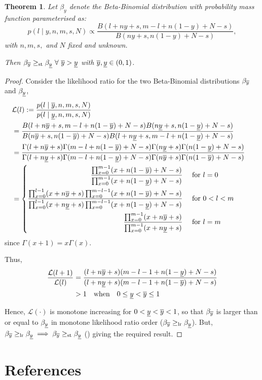 \documentclass[12pt, a4paper]{elsarticle}
\newtheorem{theorem}{Theorem}
\begin{document}
\begin{theorem}
  \label{thm:y}
  Let $\beta_y$ denote the Beta-Binomial distribution with probability mass function parameterised as:
  \[ p(l \mid y, n, m, s, N) \propto \frac{B(l + ny + s, m - l + n(1-y) + N - s)}{B(ny + s, n(1-y) + N - s)}, \]
  with $n, m, s,$ and $N$ fixed and unknown.
  
  Then $\beta_{\overline{y}} \ge_{\mathrm{st}} \beta_{\underline{y}} \ \forall \ \overline{y} > \underline{y}$ with $\overline{y}, \underline{y} \in (0,1)$.
\end{theorem}

\begin{proof}%
  \label{prf:y}
  Consider the likelihood ratio for the two Beta-Binomial distributions $\beta_{\overline{y}}$ and $\beta_{\underline{y}}$,
  \begin{align*}
    \lefteqn{\mathcal{L}(l) := \frac{p(l \mid \yu, n, m, s, N)}{p(l \mid \yl, n, m, s, N)}} \\
    &= \frac{B(l + n \yu + s, m - l + n (1 - \yu) + N - s) B(n \yl + s, n (1 - \yl) + N - s)}
            {B(n \yu + s, n (1 - \yu) + N - s) B(l + n \yl + s, m - l + n (1 - \yl) + N - s)} \\
    &= \frac{\Gamma(l + n \yu + s) \Gamma(m - l + n (1 - \yu) + N - s) \Gamma(n \yl + s) \Gamma(n (1 - \yl) + N - s)}
            {\Gamma(l + n \yl + s) \Gamma(m - l + n (1 - \yl) + N - s) \Gamma(n \yu + s) \Gamma(n (1 - \yu) + N - s)} \\
    &= \left\{ \begin{aligned}
         \frac{\prod_{x=0}^{m-1} (x + n (1 - \yu) + N - s)}
              {\prod_{x=0}^{m-1} (x + n (1 - \yl) + N - s)} &\quad\mbox{ for } l=0 \\
         \frac{\prod_{x=0}^{l-1} (x + n \yu + s) \prod_{x=0}^{m-l-1} (x + n (1 - \yu) + N - s)}
              {\prod_{x=0}^{l-1} (x + n \yl + s) \prod_{x=0}^{m-l-1} (x + n (1 - \yl) + N - s)} &\quad\mbox{ for } 0<l<m \\
         \frac{\prod_{x=0}^{m-1} (x + n \yu + s)}
              {\prod_{x=0}^{m-1} (x + n \yl + s)} &\quad\mbox{ for } l=m
       \end{aligned} \right.
  \end{align*}
  since $\Gamma(x+1)=x \Gamma(x)$.
  
  Thus,
  \begin{align*}
    \frac{\mathcal{L}(l+1)}{\mathcal{L}(l)} &=
      \frac{(l + n \overline{y} + s) (m - l - 1 + n (1 - \underline{y}) + N - s)}
           {(l + n \underline{y} + s) (m - l - 1 + n (1 - \overline{y}) + N - s)} \\
    &> 1 \quad\mbox{when}\quad 0 \le \underline{y} < \overline{y} \le 1
  \end{align*}
    
  Hence, $\mathcal{L}(\cdot)$ is monotone increasing for $0 < \underline{y} < \overline{y} < 1$, so that $\beta_{\overline{y}}$ is larger than or equal to $\beta_{\underline{y}}$ in monotone likelihood ratio order ($\beta_{\overline{y}} \ge_\mathrm{lr} \beta_{\underline{y}}$).  But, $\beta_{\overline{y}} \ge_\mathrm{lr} \beta_{\underline{y}} \implies \beta_{\overline{y}} \ge_\mathrm{st} \beta_{\underline{y}}$ (\cite[Theorem 1.C.1, p.43]{shaked2007}) giving the required result.
\end{proof}


\section*{References}



\end{document}

